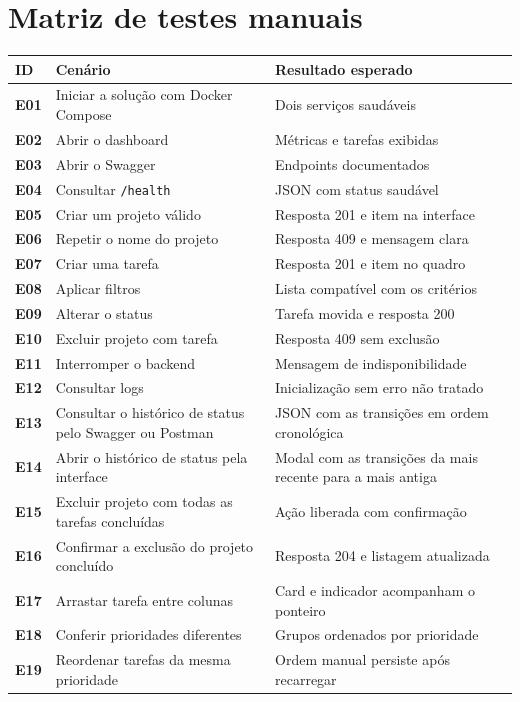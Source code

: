 \documentclass[12pt,a4paper,openany]{report}
\begin{document}
\section{Matriz de testes manuais}

\begin{longtable}{>{\bfseries}p{} p{} p{}}
\toprule
ID & Cenário & Resultado esperado \\
\midrule
\endhead
E01 & Iniciar a solução com Docker Compose & Dois serviços saudáveis \\
E02 & Abrir o dashboard & Métricas e tarefas exibidas \\
E03 & Abrir o Swagger & Endpoints documentados \\
E04 & Consultar \texttt{/health} & JSON com status saudável \\
E05 & Criar um projeto válido & Resposta 201 e item na interface \\
E06 & Repetir o nome do projeto & Resposta 409 e mensagem clara \\
E07 & Criar uma tarefa & Resposta 201 e item no quadro \\
E08 & Aplicar filtros & Lista compatível com os critérios \\
E09 & Alterar o status & Tarefa movida e resposta 200 \\
E10 & Excluir projeto com tarefa & Resposta 409 sem exclusão \\
E11 & Interromper o backend & Mensagem de indisponibilidade \\
E12 & Consultar logs & Inicialização sem erro não tratado \\
E13 & Consultar o histórico de status pelo Swagger ou Postman & JSON com as transições em ordem cronológica \\
E14 & Abrir o histórico de status pela interface & Modal com as transições da mais recente para a mais antiga \\
E15 & Excluir projeto com todas as tarefas concluídas & Ação liberada com confirmação \\
E16 & Confirmar a exclusão do projeto concluído & Resposta 204 e listagem atualizada \\
E17 & Arrastar tarefa entre colunas & Card e indicador acompanham o ponteiro \\
E18 & Conferir prioridades diferentes & Grupos ordenados por prioridade \\
E19 & Reordenar tarefas da mesma prioridade & Ordem manual persiste após recarregar \\

\end{longtable}
\end{document}
